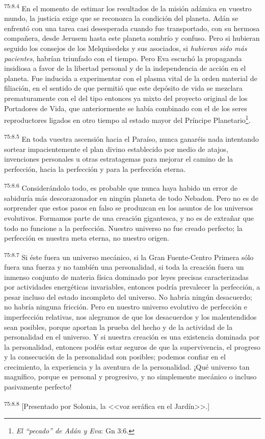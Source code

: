\par
\textsuperscript{75:8.4} En el momento de estimar los resultados de la misión adámica en vuestro mundo, la justicia exige que se reconozca la condición del planeta. Adán se enfrentó con una tarea casi desesperada cuando fue transportado, con su hermosa compañera, desde Jerusem hasta este planeta sombrío y confuso. Pero si hubieran seguido los consejos de los Melquisedeks y sus asociados, si \textit{hubieran sido más pacientes}, habrían triunfado con el tiempo. Pero Eva escuchó la propaganda insidiosa a favor de la libertad personal y de la independencia de acción en el planeta. Fue inducida a experimentar con el plasma vital de la orden material de filiación, en el sentido de que permitió que este depósito de vida se mezclara prematuramente con el del tipo entonces ya mixto del proyecto original de los Portadores de Vida, que anteriormente se había combinado con el de los seres reproductores ligados en otro tiempo al estado mayor del Príncipe Planetario\footnote{\textit{El ``pecado'' de Adán y Eva}: Gn 3:6.}.

\par
\textsuperscript{75:8.5} En toda vuestra ascensión hacia el Paraíso, nunca ganaréis nada intentando sortear impacientemente el plan divino establecido por medio de atajos, invenciones personales u otras estratagemas para mejorar el camino de la perfección, hacia la perfección y para la perfección eterna.

\par
\textsuperscript{75:8.6} Considerándolo todo, es probable que nunca haya habido un error de sabiduría más descorazonador en ningún planeta de todo Nebadon. Pero no es de sorprender que estos pasos en falso se produzcan en los asuntos de los universos evolutivos. Formamos parte de una creación gigantesca, y no es de extrañar que todo no funcione a la perfección. Nuestro universo no fue creado perfecto; la perfección es nuestra meta eterna, no nuestro origen.

\par
\textsuperscript{75:8.7} Si éste fuera un universo mecánico, si la Gran Fuente-Centro Primera sólo fuera una fuerza y no tambíén una personalidad, si toda la creación fuera un inmenso conjunto de materia física dominado por leyes precisas caracterizadas por actividades energéticas invariables, entonces podría prevalecer la perfección, a pesar incluso del estado incompleto del universo. No habría ningún desacuerdo; no habría ninguna fricción. Pero en nuestro universo evolutivo de perfección e imperfección relativas, nos alegramos de que los desacuerdos y los malentendidos sean posibles, porque aportan la prueba del hecho y de la actividad de la personalidad en el universo. Y si nuestra creación es una existencia dominada por la personalidad, entonces podéis estar seguros de que la supervivencia, el progreso y la consecución de la personalidad son posibles; podemos confiar en el crecimiento, la experiencia y la aventura de la personalidad. ¡Qué universo tan magnífico, porque es personal y progresivo, y no simplemente mecánico o incluso pasivamente perfecto!

\par
\textsuperscript{75:8.8} [Presentado por Solonia, la <<voz seráfica en el Jardín>>.]